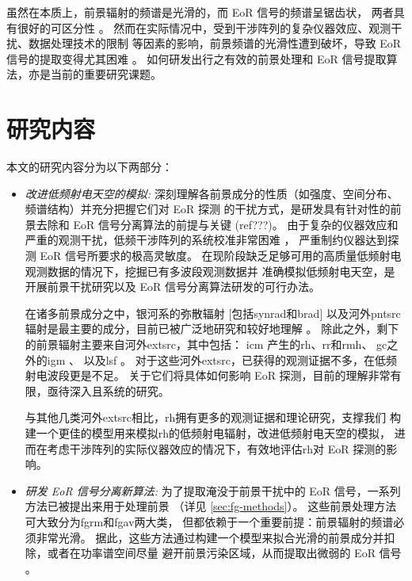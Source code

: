 虽然在本质上，前景辐射的频谱是光滑的，而 EoR 信号的频谱呈锯齿状，
两者具有很好的可区分性 \cite{wang2006,jelic2008,harker2009,wang2013}。
然而在实际情况中，受到干涉阵列的复杂仪器效应、观测干扰、数据处理技术的限制
等因素的影响，前景频谱的光滑性遭到破坏，导致 EoR 信号的提取变得尤其困难
\cite{liu2009ps,labropoulos2009,gehlot2018,mertens2018}。
如何研发出行之有效的前景处理和 EoR 信号提取算法，亦是当前的重要研究课题。


\section{研究内容}
\label{sec:content}

本文的研究内容分为以下两部分：
\begin{itemize}
\item
\emph{改进低频射电天空的模拟:}
深刻理解各前景成分的性质（如强度、空间分布、频谱结构）并充分把握它们对 EoR 探测
的干扰方式，是研发具有针对性的前景去除和 EoR 信号分离算法的前提与关键 (ref???)。
由于复杂的仪器效应和严重的观测干扰，低频干涉阵列的系统校准非常困难
\cite{noordam2004,intema2009,wijnholds2010,barry2016,gehlot2018}，
严重制约仪器达到探测 EoR 信号所要求的极高灵敏度。
在现阶段缺乏足够可用的高质量低频射电观测数据的情况下，挖掘已有多波段观测数据并
准确模拟低频射电天空，是开展前景干扰研究以及 EoR 信号分离算法研发的可行办法。

\hspace{2\ccwd}%
在诸多前景成分之中，银河系的弥散辐射 [包括\ac{synrad}和\ac{brad}]
以及河外\ac{pntsrc}辐射是最主要的成分，目前已被广泛地研究和较好地理解
\cite{shaver1999,diMatteo2004,gleser2008,liu2012,murray2017,spinelli2018}。
除此之外，剩下的前景辐射主要来自河外\ac{extsrc}，其中包括：
\ac{icm} \cite{feretti2012} 产生的\ac{rh}、\ac{rr}和\ac{rmh}、
\ac{gc}之外的\ac{igm} \cite{keshet2004}、
以及\ac{lsf} \cite{vazza2015}。
对于这些河外\acl{extsrc}，已获得的观测证据不多，在低频射电波段更是不足。
关于它们将具体如何影响 EoR 探测，目前的理解非常有限，亟待深入且系统的研究。

\hspace{2\ccwd}%
与其他几类河外\acl{extsrc}相比，\acl{rh}拥有更多的观测证据和理论研究，支撑我们
构建一个更佳的模型用来模拟\acl{rh}的低频射电辐射，改进低频射电天空的模拟，
进而在考虑干涉阵列的实际仪器效应的情况下，有效地评估\acl{rh}对 EoR 探测的影响。

\item
\emph{研发 EoR 信号分离新算法:}
为了提取淹没于前景干扰中的 EoR 信号，一系列方法已被提出来用于处理前景
（详见 \autoref{sec:fg-methods}）。
这些前景处理方法可大致分为\ac{fgrm}和\ac{fgav}两大类，
但都依赖于一个重要前提：前景辐射的频谱必须非常光滑。
据此，这些方法通过构建一个模型来拟合光滑的前景成分并扣除，或者在功率谱空间尽量
避开前景污染区域，从而提取出微弱的 EoR 信号 \cite{chapman2016}。


\end{itemize}
